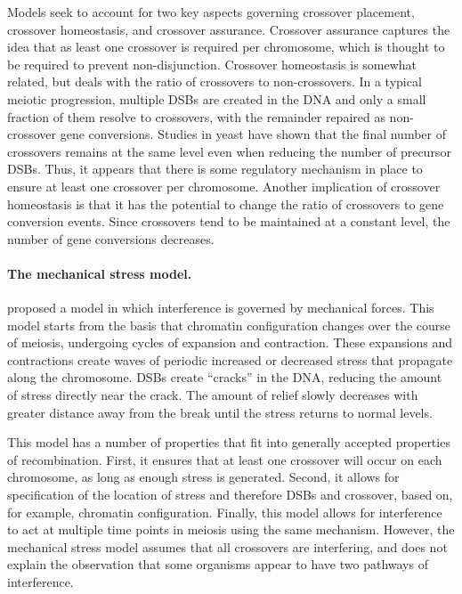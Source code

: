 Models seek to account for two key aspects governing crossover placement, crossover homeostasis, and crossover assurance.
Crossover assurance captures the idea that as least one crossover is required per chromosome, which is thought to be required to prevent non-disjunction.
Crossover homeostasis is somewhat related, but deals with the ratio of crossovers to non-crossovers.
In a typical meiotic progression, multiple DSBs are created in the DNA and only a small fraction of them resolve to crossovers, with the remainder repaired as non-crossover gene conversions.
Studies in yeast have shown that the final number of crossovers remains at the same level even when reducing the number of precursor DSBs\cite{Martini2006}.
Thus, it appears that there is some regulatory mechanism in place to ensure at least one crossover per chromosome.
Another implication of crossover homeostasis is that it has the potential to change the ratio of crossovers to gene conversion events.
Since crossovers tend to be maintained at a constant level, the number of gene conversions decreases.


\paragraph{The mechanical stress model.}
\citet{Kleckner2004} proposed a model in which interference is governed by mechanical forces.
This model starts from the basis that chromatin configuration changes over the course of meiosis, undergoing cycles of expansion and contraction.
These expansions and contractions create waves of periodic increased or decreased stress that propagate along the chromosome.
DSBs create ``cracks'' in the DNA, reducing the amount of stress directly near the crack.
The amount of relief slowly decreases with greater distance away from the break until the stress returns to normal levels.

This model has a number of properties that fit into generally accepted properties of recombination.
First, it ensures that at least one crossover will occur on each chromosome, as long as enough stress is generated.
Second, it allows for specification of the location of stress and therefore DSBs and crossover, based on, for example, chromatin configuration.
Finally, this model allows for interference to act at multiple time points in meiosis using the same mechanism.
However, the mechanical stress model assumes that all crossovers are interfering, and does not explain the observation that some organisms appear to have two pathways of interference.

